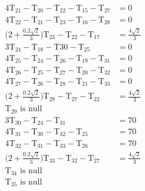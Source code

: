 \documentclass[12pt,a4paper]{article}
\begin{document}
\begin{align*}
4\text{T}_{21}-\text{T}_{20}-\text{T}_{22}-\text{T}_{15}-\text{T}_{27} & =0\\
4\text{T}_{22}-\text{T}_{21}-\text{T}_{23}-\text{T}_{16}-\text{T}_{28} & =0\\
\bigg(2+\frac{0.2\sqrt{2}}{3}\bigg)\text{T}_{23}-\text{T}_{22}-\text{T}_{17} & =\frac{4\sqrt{2}}{3}\\
3\text{T}_{24}-\text{T}_{18}-\text{T}{30}-\text{T}_{25} &=0\\
4\text{T}_{25}-\text{T}_{24}-\text{T}_{26}-\text{T}_{19}-\text{T}_{31} & =0\\
4\text{T}_{26}-\text{T}_{25}-\text{T}_{27}-\text{T}_{20}-\text{T}_{32} & =0\\
4\text{T}_{27}-\text{T}_{26}-\text{T}_{28}-\text{T}_{21}-\text{T}_{33} & =0\\
\bigg(2+\frac{0.2\sqrt{2}}{3}\bigg)\text{T}_{28}-\text{T}_{27}-\text{T}_{22} & =\frac{4\sqrt{2}}{3}\\
\text{T}_{29} \text{ is null}\\
3\text{T}_{30}-\text{T}_{24}-\text{T}_{31} &=70\\
4\text{T}_{31}-\text{T}_{30}-\text{T}_{32}-\text{T}_{25} &=70\\
4\text{T}_{32}-\text{T}_{31}-\text{T}_{33}-\text{T}_{26} &=70\\
\bigg(2+\frac{0.2\sqrt{2}}{3}\bigg)\text{T}_{33}-\text{T}_{32}-\text{T}_{27} & =\frac{4\sqrt{2}}{3}\\
\text{T}_{34} \text{ is null}\\
\text{T}_{35} \text{ is null}
\end{align*}
\end{document}
